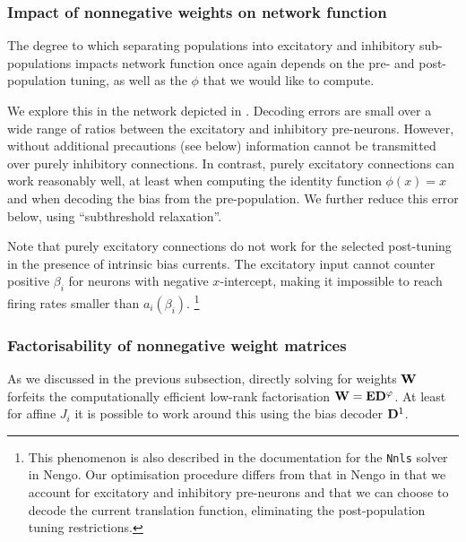 \subsubsection{Impact of nonnegative weights on network function}
The degree to which separating populations into excitatory and inhibitory sub-populations impacts network function once again depends on the pre- and post-population tuning, as well as the $\phi$ that we would like to compute.

We explore this in the network depicted in .
Decoding errors are small over a wide range of ratios between the excitatory and inhibitory pre-neurons.
However, without additional precautions (see below) information cannot be transmitted over purely inhibitory connections.
In contrast, purely excitatory connections can work reasonably well, at least when computing the identity function $\phi(x) = x$ and when decoding the bias from the pre-population.
We further reduce this error below, using \enquote{subthreshold relaxation}.

Note that purely excitatory connections do not work for the selected post-tuning in the presence of intrinsic bias currents.
The excitatory input cannot counter positive $\beta_i$ for neurons with negative $x$-intercept, making it impossible to reach firing rates smaller than $a_i(\beta_i)$.%
\footnote{This phenomenon is also described in the documentation for the \texttt{Nnls} solver in Nengo. 
Our optimisation procedure differs from that in Nengo in that we account for excitatory and inhibitory pre-neurons and that we can choose to decode the current translation function, eliminating the post-population tuning restrictions.}

\subsubsection{Factorisability of nonnegative weight matrices}
As we discussed in the previous subsection, directly solving for weights $\mathbf{W}$ forfeits the computationally efficient low-rank factorisation $\mathbf{W} = \mathbf{E} \mathbf{D}^\varphi$.
At least for affine $J_i$ it is possible to work around this using the bias decoder $\mathbf{D}^1$.

